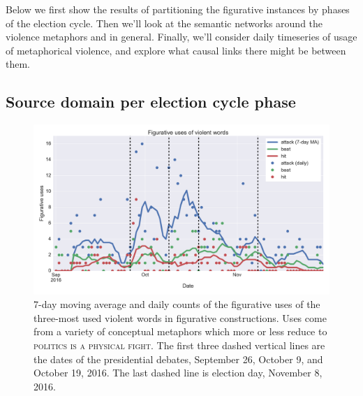 Below we first show the results of partitioning the figurative instances 
by phases of the election cycle. Then we'll look at the semantic networks
around the violence metaphors and in general. Finally, we'll consider 
daily timeseries of usage of metaphorical violence, and explore what causal
links there might be between them.

\subsection{Source domain per election cycle phase}
\label{sub:Source-domain-per-election-cycle-phase}


\begin{figure}
\begin{center}
  \hspace*{-.25in}
  \includegraphics[width=1.25\textwidth]{figures/fig_uses_violent_words-FIG1.pdf}
\end{center}
\caption{
  7-day moving average and daily counts of the figurative uses of the three-most
  used violent words in figurative constructions. Uses come from a variety of
  conceptual metaphors which more or less reduce to 
  \textsc{politics is a physical fight}. The first three dashed 
  vertical lines are the dates of the presidential debates, 
  September 26, October 9, and October 19, 2016. The last dashed
  line is election day, November 8, 2016.
}
\label{fig:}
\end{figure}



